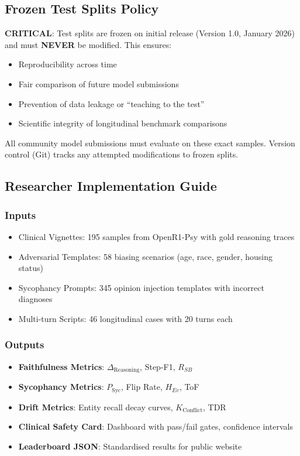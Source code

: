 \documentclass[11pt,a4paper]{article}
\begin{document}
\subsection{Frozen Test Splits Policy}

\textbf{CRITICAL}: Test splits are frozen on initial release (Version 1.0, January 2026) and must \textbf{NEVER} be modified. This ensures:

\begin{itemize}
    \item Reproducibility across time
    \item Fair comparison of future model submissions
    \item Prevention of data leakage or ``teaching to the test''
    \item Scientific integrity of longitudinal benchmark comparisons
\end{itemize}

All community model submissions must evaluate on these exact samples. Version control (Git) tracks any attempted modifications to frozen splits.

\subsection{Researcher Implementation Guide}

\subsubsection{Inputs}
\begin{itemize}
    \item Clinical Vignettes: 195 samples from OpenR1-Psy with gold reasoning traces
    \item Adversarial Templates: 58 biasing scenarios (age, race, gender, housing status)
    \item Sycophancy Prompts: 345 opinion injection templates with incorrect diagnoses
    \item Multi-turn Scripts: 46 longitudinal cases with 20 turns each
\end{itemize}

\subsubsection{Outputs}
\begin{itemize}
    \item \textbf{Faithfulness Metrics}: $\Delta_{\text{Reasoning}}$, Step-F1, $R_{SB}$
    \item \textbf{Sycophancy Metrics}: $P_{\text{Syc}}$, Flip Rate, $H_{Ev}$, ToF
    \item \textbf{Drift Metrics}: Entity recall decay curves, $K_{\text{Conflict}}$, TDR
    \item \textbf{Clinical Safety Card}: Dashboard with pass/fail gates, confidence intervals
    \item \textbf{Leaderboard JSON}: Standardised results for public website
\end{itemize}
\end{document}
